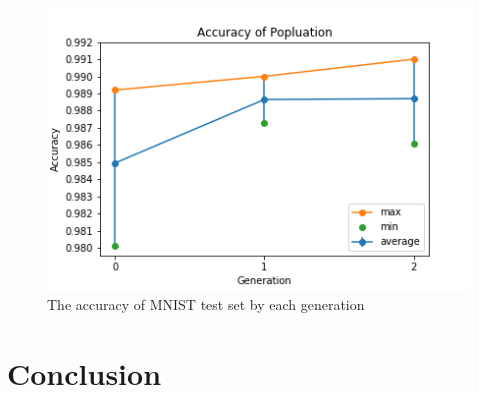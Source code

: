 \documentclass[12pt]{article}
\begin{document}
\begin{figure}
\begin{center}
\includegraphics[width =5.5in]{3gen_test.png}
\caption{The accuracy of MNIST test set by each generation}
\end{center}
\label{fig:pic9}
\end{figure}
\section{Conclusion}
\end{document}
